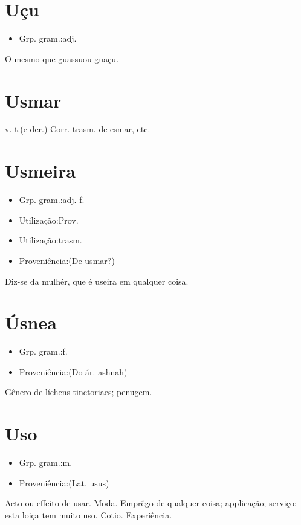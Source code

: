 \documentclass{article}
\begin{document}
\section{Uçu}
\begin{itemize}
\item {Grp. gram.:adj.}
\end{itemize}
O mesmo que \textunderscore guassu\textunderscore  ou \textunderscore guaçu\textunderscore .
\section{Usmar}
\textunderscore v. t.\textunderscore  (e der.)
Corr. trasm. de \textunderscore esmar\textunderscore , etc.
\section{Usmeira}
\begin{itemize}
\item {Grp. gram.:adj. f.}
\end{itemize}
\begin{itemize}
\item {Utilização:Prov.}
\end{itemize}
\begin{itemize}
\item {Utilização:trasm.}
\end{itemize}
\begin{itemize}
\item {Proveniência:(De \textunderscore usmar\textunderscore ?)}
\end{itemize}
Diz-se da mulhér, que é useira em qualquer coisa.
\section{Úsnea}
\begin{itemize}
\item {Grp. gram.:f.}
\end{itemize}
\begin{itemize}
\item {Proveniência:(Do ár. \textunderscore ashnah\textunderscore )}
\end{itemize}
Gênero de líchens tinctoriaes; penugem.
\section{Uso}
\begin{itemize}
\item {Grp. gram.:m.}
\end{itemize}
\begin{itemize}
\item {Proveniência:(Lat. \textunderscore usus\textunderscore )}
\end{itemize}
Acto ou effeito de usar.
Moda.
Emprêgo de qualquer coisa; applicação; serviço: \textunderscore esta loiça tem muito uso\textunderscore .
Cotio.
Experiência.
\end{document}

